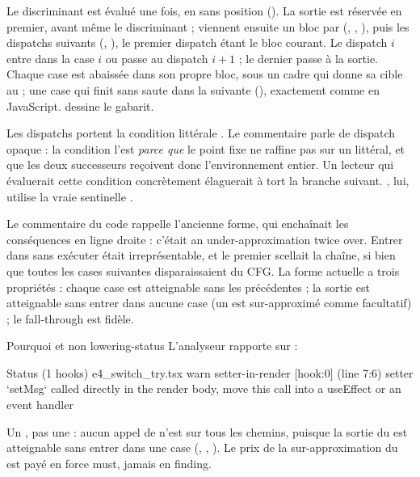Le discriminant est évalué une fois, en  sans position (). La sortie  est réservée en premier, avant même le discriminant ; viennent ensuite un bloc par  (, , ), puis les dispatchs suivants (, ), le premier dispatch étant le bloc courant. Le dispatch $i$ entre dans la case $i$ ou passe au dispatch $i+1$ ; le dernier passe à la sortie. Chaque case est abaissée dans son propre bloc, sous un cadre  qui donne sa cible au  ; une case qui finit sans  saute dans la suivante (), exactement comme en JavaScript.  dessine le gabarit.

Les dispatchs portent la condition littérale . Le commentaire parle de dispatch \og opaque\fg{} : la condition l'est \emph{parce que} le point fixe ne raffine pas sur un littéral, et que les deux successeurs reçoivent donc l'environnement entier. Un lecteur qui évaluerait cette condition concrètement élaguerait à tort la branche \og suivant\fg{}. , lui, utilise la vraie sentinelle .

Le commentaire du code rappelle l'ancienne forme, qui enchaînait les conséquences en ligne droite : c'était \og an under-approximation twice over\fg{}. Entrer dans  sans exécuter  était irreprésentable, et le premier  scellait la chaîne, si bien que toutes les cases suivantes disparaissaient du CFG. La forme actuelle a trois propriétés : chaque case est atteignable sans les précédentes ; la sortie est atteignable sans entrer dans aucune case (un  est sur-approximé comme facultatif) ; le fall-through est fidèle.

\begin{exemple}{Pourquoi \Warning{} et non \Error{}}{lowering-status}
L'analyseur rapporte sur  :
\begin{sortie}
  Status  (1 hooks)  e4_switch_try.tsx
    warn   setter-in-render  [hook:0]  (line 7:6)  setter `setMsg` called directly in the render body, move this call into a useEffect or an event handler
\end{sortie}
Un \Warning{}, pas une \Error{} : aucun appel de  n'est sur tous les chemins, puisque la sortie  du  est atteignable sans entrer dans une case (, , ). Le prix de la sur-approximation du  est payé en force must, jamais en finding.
\end{exemple}

